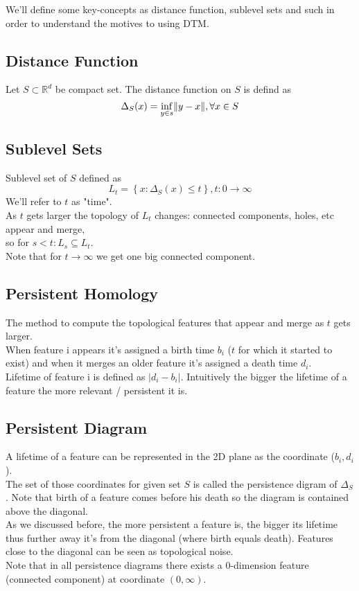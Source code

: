 \documentclass[11pt]{article}
\theoremstyle{definition}
\theoremstyle{definition}
\begin{document}
We'll define some key-concepts as distance function, sublevel sets and such in order to understand the motives to using DTM.

\subsection{Distance Function}
Let $S \subset \mathbb{R}^d$ be compact set. The distance function on $S$ is defind as
$$\Delta_S(x) = \inf_{y \in s} \mathopen\| y-x \mathclose\|, \forall x \in S$$

\subsection{Sublevel Sets}
Sublevel set of $S$ defined as
$$L_t = \left\{ x: \Delta_S(x) \leq t \right\}, t: 0 \rightarrow \infty$$
We'll refer to $t$ as "time".\\
As $t$ gets larger the topology of $L_t$ changes: connected components, holes, etc appear and merge,\\ so for $s < t: L_s \subseteq L_t$.\\
Note that for $t \rightarrow \infty$ we get one big connected component.


\subsection{Persistent Homology}
The method to compute the topological features that appear and merge as $t$ gets larger.\\
When feature i appears it's assigned a birth time $b_i$ ($t$ for which it started to exist) and when it merges an older feature it's assigned a death time $d_i$.\\
Lifetime of feature i is defined as $|d_i - b_i|$.
Intuitively the bigger the lifetime of a feature the more relevant / persistent it is.

\subsection{Persistent Diagram}
A lifetime of a feature can be represented in the 2D plane as the coordinate ($b_i,d_i$).\\
The set of those coordinates for given set $S$ is called the persistence digram of $\Delta_S$. Note that birth of a feature comes before his death so the diagram is contained above the diagonal.\\
As we discussed before, the more persistent a feature is, the bigger its lifetime thus further away it's from the diagonal (where birth equals death). Features close to the diagonal can be seen as topological noise.\\
Note that in all persistence diagrams there exists a 0-dimension feature (connected component) at coordinate $(0,\infty)$.
\end{document}
